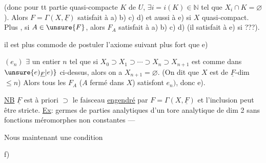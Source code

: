 (donc pour tt partie quasi-compacte $K$ de $U$, $\exists i=i(K)\in\mathbb N$ tel que $X_i\cap K=\varnothing$). Alors $F=\Gamma(X,\underline F)$ satisfait à a) b) c) d)  et aussi à e) si $X$ quasi-compact. Plus , si $A\in\unsure{F}$, alors $F_A$  satisfait à a) b) c) d)  (il satisfait à e) si ???).

 il est plus commode de postuler l'axiome suivant plus fort que e)

$(e_n)$ $\exists$ un entier $n$ tel que si  $X_0\supset X_1\supset\cdots\supset X_n\supset X_{n+1}$ est comme dans $\unsure{e)_{\underline F}|e)}$ ci-dessus, alors on a $X_{n+1}=\varnothing$. (On dit que $X$ est de $\underline F$-dim $\leq n$)
Alors tous les $F_A$ ($A$  fermé dans $X$) satisfont  $e_n)$, donc e).

\uline{NB} $\underline F$ est à priori $\supset$ le faisceau \uline{engendré} par $F=\Gamma(X,\underline F)$ et l'inclusion peut être stricte. \uline{Ex}: germes de parties analytiques d'un tore analytique de dim 2 sans fonctions méromorphes non constantes ---

Nous   maintenant une condition

f)
